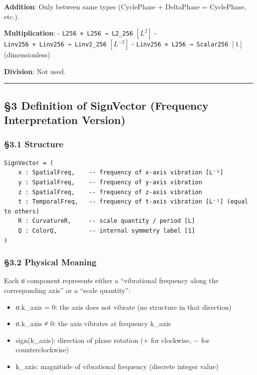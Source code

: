 \documentclass[a4paper,11pt]{article}
\providecommand{\tightlist}{\setlength{\itemsep}{0pt}\setlength{\parskip}{0pt}}
\begin{document}
\textbf{Addition}: Only between same types (CyclePhase + DeltaPhase =
CyclePhase, etc.).

\textbf{Multiplication}: - \texttt{L256\ ×\ L256\ →\ L2\_256} \([L^2]\)
- \texttt{Linv256\ ×\ Linv256\ →\ Linv2\_256} \([L^{-2}]\) -
\texttt{Linv256\ ×\ L256\ →\ Scalar256} \([1]\) (dimensionless)

\textbf{Division}: Not used.

\begin{center}\rule{0.5\linewidth}{0.5pt}\end{center}

\subsection{§3 Definition of SignVector (Frequency Interpretation
Version)}\label{definition-of-signvector-frequency-interpretation-version}

\subsubsection{§3.1 Structure}\label{structure}

\begin{verbatim}
SignVector = (
    x : SpatialFreq,    -- frequency of x-axis vibration [L⁻¹]
    y : SpatialFreq,    -- frequency of y-axis vibration
    z : SpatialFreq,    -- frequency of z-axis vibration
    t : TemporalFreq,   -- frequency of t-axis vibration [L⁻¹] (equal to others)
    R : CurvatureR,     -- scale quantity / period [L]
    Q : ColorQ,         -- internal symmetry label [1]
)
\end{verbatim}

\subsubsection{§3.2 Physical Meaning}\label{physical-meaning}

Each σ component represents either a ``vibrational frequency along the
corresponding axis'' or a ``scale quantity'':

\begin{itemize}
\tightlist
\item
  σ.k\_axis = 0: the axis does not vibrate (no structure in that
  direction)
\item
  σ.k\_axis ≠ 0: the axis vibrates at frequency
  \textbar k\_axis\textbar{}
\item
  sign(k\_axis): direction of phase rotation (+ for clockwise, − for
  counterclockwise)
\item
  \textbar k\_axis\textbar: magnitude of vibrational frequency (discrete
  integer value)
\end{itemize}
\end{document}
